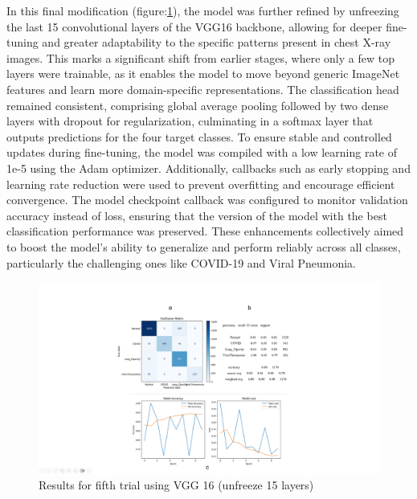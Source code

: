\documentclass{article}
\begin{document}
In this final modification (figure:\ref{fig:vgg16result5.png}), the model was further refined by unfreezing the last 15 convolutional layers of the VGG16 backbone, allowing for deeper fine-tuning and greater adaptability to the specific patterns present in chest X-ray images. This marks a significant shift from earlier stages, where only a few top layers were trainable, as it enables the model to move beyond generic ImageNet features and learn more domain-specific representations. The classification head remained consistent, comprising global average pooling followed by two dense layers with dropout for regularization, culminating in a softmax layer that outputs predictions for the four target classes. To ensure stable and controlled updates during fine-tuning, the model was compiled with a low learning rate of 1e-5 using the Adam optimizer. Additionally, callbacks such as early stopping and learning rate reduction were used to prevent overfitting and encourage efficient convergence. The model checkpoint callback was configured to monitor validation accuracy instead of loss, ensuring that the version of the model with the best classification performance was preserved. These enhancements collectively aimed to boost the model's ability to generalize and perform reliably across all classes, particularly the challenging ones like COVID-19 and Viral Pneumonia.

\begin{figure}[h!] %
    \centering
    \includegraphics[width=1.0\linewidth]{vgg15-15.png}
    \caption{Results for fifth trial using VGG 16 (unfreeze 15 layers)}
    \label{fig:vgg16result5.png}
\end{figure}
\end{document}
